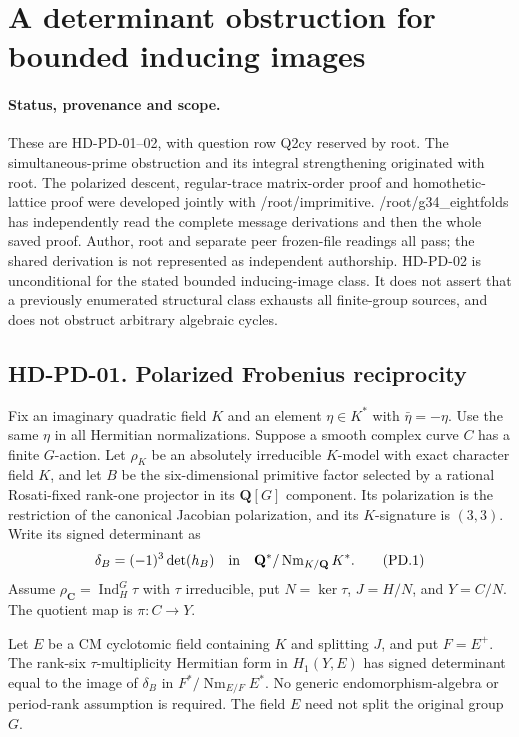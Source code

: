 \section{A determinant obstruction for bounded inducing images}
\label{sec:bounded-inducing-determinants}

\paragraph{Status, provenance and scope.}
These are HD-PD-01--02, with question row Q2cy reserved by root.
The simultaneous-prime obstruction and its integral strengthening
originated with root.  The polarized descent, regular-trace
matrix-order proof and homothetic-lattice proof were developed
jointly with /root/imprimitive.  /root/g34\_eightfolds has
independently read the complete message derivations and then the whole
saved proof. Author, root and separate peer frozen-file readings all pass;
the shared derivation is not represented as independent authorship.
HD-PD-02 is unconditional for the stated bounded inducing-image
class.  It does not assert that a previously enumerated structural
class exhausts all finite-group sources, and does not obstruct
arbitrary algebraic cycles.

\subsection*{HD-PD-01. Polarized Frobenius reciprocity}

Fix an imaginary quadratic field $K$ and an element
$\eta\in K^*$ with $\bar\eta=-\eta$.
Use the same $\eta$ in all Hermitian normalizations.
Suppose a smooth complex curve $C$ has a finite $G$-action.
Let $\rho_K$ be an absolutely irreducible $K$-model with exact
character field $K$, and let $B$ be the six-dimensional primitive
factor selected by a rational Rosati-fixed rank-one projector in
its $\mathbf Q[G]$ component.  Its polarization is the restriction
of the canonical Jacobian polarization, and its $K$-signature
is $(3,3)$.  Write its signed determinant as
\[
 \delta_B=(-1)^3\det(h_B)
    \quad\hbox{in}\quad
 \mathbf Q^*/\operatorname{Nm}_{K/\mathbf Q}K^*.
 \tag{PD.1}
\]
Assume
$\rho_{\mathbf C}=\operatorname{Ind}_H^G\tau$ with $\tau$
irreducible, put $N=\ker\tau$, $J=H/N$, and $Y=C/N$.
The quotient map is $\pi:C\to Y$.

\begin{proposition}[HD-PD-01]
Let $E$ be a CM cyclotomic field containing $K$ and splitting
$J$, and put $F=E^+$.  The rank-six $\tau$-multiplicity Hermitian
form in $H_1(Y,E)$ has signed determinant equal to the image of
$\delta_B$ in $F^*/\operatorname{Nm}_{E/F}E^*$.
No generic endomorphism-algebra or period-rank assumption is
required.  The field $E$ need not split the original group $G$.
\end{proposition}

